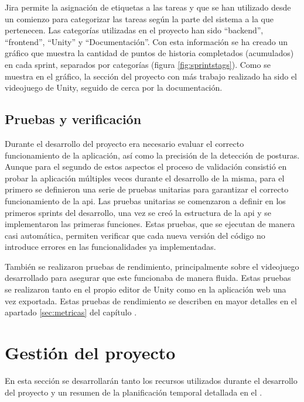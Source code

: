 Jira permite la asignación de etiquetas a las tareas y que se han utilizado desde un
comienzo para categorizar las tareas según la parte del sistema a la que pertenecen.
Las categorías utilizadas en el proyecto han sido \enquote{\gls{backend}},
\enquote{\gls{frontend}}, \enquote{Unity} y \enquote{Documentación}. Con esta información
se ha creado un gráfico que muestra la cantidad de puntos de historia completados
(acumulados) en cada sprint, separados por categorías (figura \ref{fig:sprintstags}).
Como se muestra en el gráfico, la sección del proyecto con más trabajo realizado ha sido el
videojuego de Unity, seguido de cerca por la documentación.



\subsection{Pruebas y verificación}
Durante el desarrollo del proyecto era necesario evaluar el correcto funcionamiento de la aplicación,
así como la precisión de la detección de posturas. Aunque para el segundo de estos aspectos el
proceso de validación consistió en probar la aplicación múltiples veces durante el desarrollo de
la misma, para el primero se definieron una serie de pruebas unitarias para garantizar el correcto
funcionamiento de la \gls{api}. Las pruebas unitarias se comenzaron a definir en los primeros sprints
del desarrollo, una vez se creó la estructura de la \gls{api} y se implementaron las primeras
funciones. Estas pruebas, que se ejecutan de manera casi automática, permiten verificar que cada nueva
versión del código no introduce errores en las funcionalidades ya implementadas.

También se realizaron pruebas de rendimiento, principalmente sobre el videojuego desarrollado para
asegurar que este funcionaba de manera fluida. Estas pruebas se realizaron tanto en el propio
editor de Unity como en la aplicación web una vez exportada. Estas pruebas de rendimiento
se describen en mayor detalles en el apartado \ref{sec:metricas} del capítulo .

\section{Gestión del proyecto}
\label{sec:gestion}
En esta sección se desarrollarán tanto los recursos utilizados durante el desarrollo del proyecto y
un resumen de la planificación temporal detallada en el \tercerAnexo.

